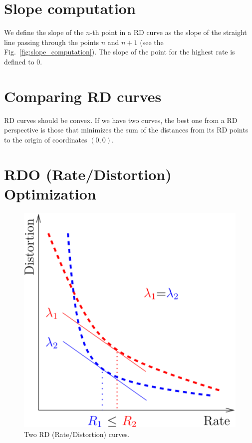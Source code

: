 
\section{Slope computation}
We define the slope of the                            
    $n$-th point in a RD curve as the slope of the straight line                             
    passing through the points $n$ and $n+1$ (see the                                        
    Fig.~\ref{fig:slope_computation}). The slope of the point for the                        
    highest rate is defined to $0$.

\section{Comparing RD curves}
RD curves should be convex. If we have two curves, the best one from a
RD perspective is those that minimizes the sum of the distances from
its RD points to the origin of coordinates $(0,0)$.

\section{RDO (Rate/Distortion) Optimization}

\begin{figure}
  \centering
  \includegraphics[width=1.0\textwidth]{graphics/RD_slopes} 
  \caption{Two RD (Rate/Distortion) curves.}
  \label{fig:RD_slopes}
\end{figure}

